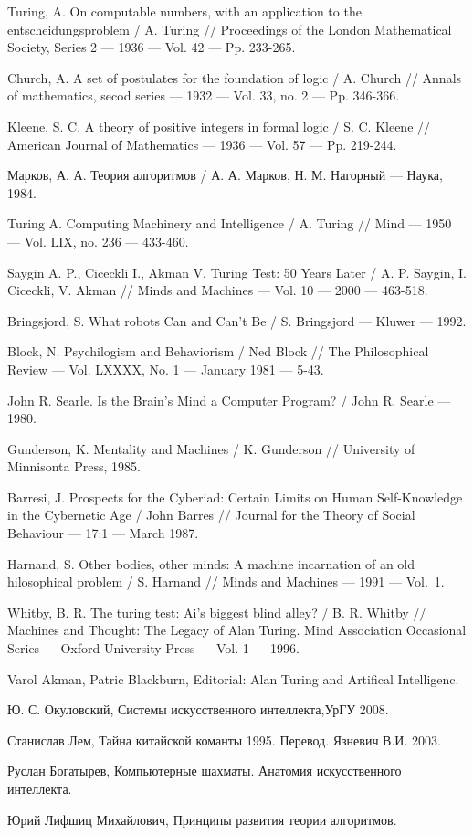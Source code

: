 \documentclass[a4paper,14pt]{scrartcl}
\begin{document}
\begin{thebibliography}{99}
Turing, A. On computable numbers, with an application to the entscheidungsproblem / A. Turing // Proceedings of the London Mathematical Society, Series 2 — 1936 — Vol. 42 — Pp. 233-265.

Church, A. A set of postulates for the foundation of logic / A. Church // Annals of mathematics, secod series — 1932 — Vol. 33, no. 2 — Pp. 346-366.

Kleene, S. C. A theory of positive integers in formal logic / S. C. Kleene // American Journal of Mathematics — 1936 — Vol. 57 — Pp. 219-244.

Марков, А. А. Теория алгоритмов / А. А. Марков, Н. М. Нагорный — Наука, 1984.

Turing A. Computing Machinery and Intelligence / A. Turing // Mind — 1950 — Vol. LIX, no. 236 — 433-460.

Saygin A. P., Ciceckli I., Akman V. Turing Test: 50 Years Later /  A. P. Saygin,  I. Ciceckli, V. Akman // Minds and Machines — Vol. 10 — 2000 — 463-518.

Bringsjord, S. What robots Can and Can't Be / S. Bringsjord — Kluwer — 1992.

Block, N. Psychilogism and Behaviorism / Ned Block // The Philosophical Review — Vol. LXXXX, No. 1 — January 1981 — 5-43.

John R. Searle. Is the Brain's Mind a Computer Program? /  John R. Searle — 1980.

Gunderson, K. Mentality and Machines / K. Gunderson // University of Minnisonta Press, 1985.

Barresi, J. Prospects for the Cyberiad: Certain Limits on Human Self-Knowledge in the Cybernetic Age / John Barres // Journal for the Theory of Social Behaviour — 17:1 — March 1987.

Harnand, S. Other bodies, other minds: A machine incarnation of an old hilosophical problem / S. Harnand // Minds and Machines — 1991 — Vol.~1.

Whitby, B. R. The turing test: Ai's biggest blind alley? / B. R. Whitby // Machines and Thought: The Legacy of Alan Turing. Mind Association Occasional Series — Oxford University Press — Vol. 1 — 1996.

Varol Akman, Patric Blackburn, Editorial: Alan Turing and Artifical Intelligenc.

Ю. С. Окуловский, Системы искусственного интеллекта,УрГУ 2008.

Станислав Лем, Тайна китайской команты 1995. Перевод. Язневич В.И. 2003.

Руслан Богатырев, Компьютерные шахматы. Анатомия искусственного интеллекта.

Юрий Лифшиц Михайлович, Принципы развития теории алгоритмов.

\end{thebibliography}
\end{document}
